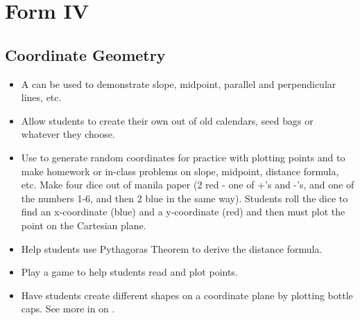 \section{Form IV}

	\subsection{Coordinate Geometry} \label{coordgeo}
	\begin{itemize}
	\item A  can be used to demonstrate slope, midpoint, parallel and perpendicular lines, etc.
	\item Allow students to create their own  out of old calendars, seed bags or whatever they choose.
	\item Use  to generate random coordinates for practice with plotting points and to make homework or in-class problems on slope, midpoint, distance formula, etc. Make four dice out of manila paper (2 red - one of +'s and -'s, and one of the numbers 1-6, and then 2 blue in the same way). Students roll the dice to find an x-coordinate (blue) and a y-coordinate (red) and then must plot the point on the Cartesian plane.
	\item Help students use Pythagoras Theorem to derive the distance formula.
	\item Play a  game to help students read and plot points.
	\item Have students create different shapes on a coordinate plane by plotting bottle caps. See more in  on .
	\end{itemize}

